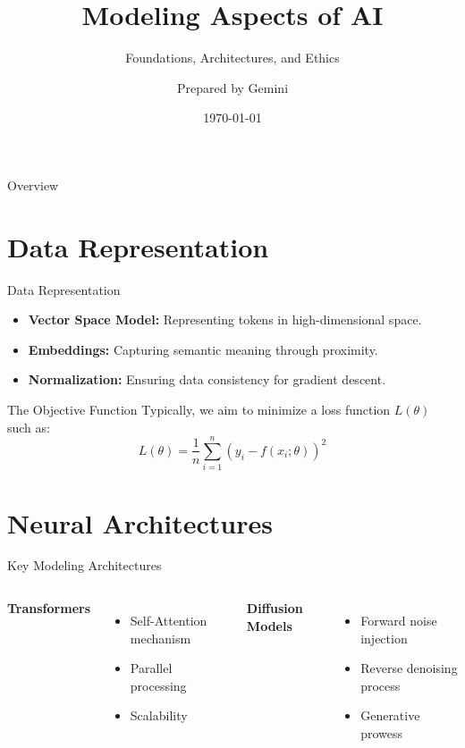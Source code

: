 \documentclass{beamer}
\title{Modeling Aspects of AI}
\subtitle{Foundations, Architectures, and Ethics}
\author{Prepared by Gemini}
\date{\today}
\begin{document}
\begin{frame}
    \titlepage
\end{frame}

\begin{frame}{Overview}
    \tableofcontents
\end{frame}

\section{Data Representation}
\begin{frame}{Data Representation}
    \begin{itemize}
        \item \textbf{Vector Space Model:} Representing tokens in high-dimensional space.
        \item \textbf{Embeddings:} Capturing semantic meaning through proximity.
        \item \textbf{Normalization:} Ensuring data consistency for gradient descent.
    \end{itemize}
    \begin{block}{The Objective Function}
        Typically, we aim to minimize a loss function $L(\theta)$ such as:
        $$L(\theta) = \frac{1}{n} \sum_{i=1}^{n} (y_i - f(x_i; \theta))^2$$
    \end{block}
\end{frame}

\section{Neural Architectures}
\begin{frame}{Key Modeling Architectures}
    \begin{columns}
        \textbf{Transformers}
        \begin{itemize}
            \item Self-Attention mechanism
            \item Parallel processing
            \item Scalability
        \end{itemize}
        
        \textbf{Diffusion Models}
        \begin{itemize}
            \item Forward noise injection
            \item Reverse denoising process
            \item Generative prowess
        \end{itemize}
    \end{columns}
\end{frame}
\end{document}
